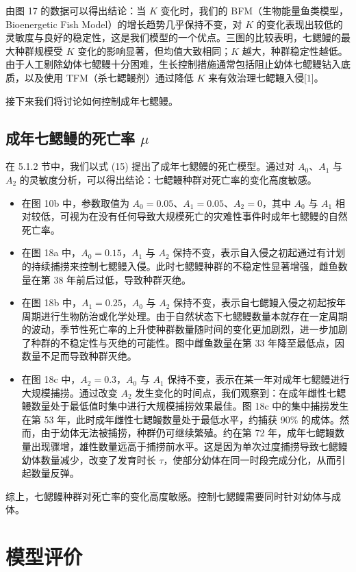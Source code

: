\documentclass[11pt,a4paper]{ctexart}
\begin{document}
由图 17 的数据可以得出结论：当 $K$ 变化时，我们的 BFM（生物能量鱼类模型，Bioenergetic Fish Model）的增长趋势几乎保持不变，对 $K$ 的变化表现出较低的灵敏度与良好的稳定性，这是我们模型的一个优点。三图的比较表明，七鳃鳗的最大种群规模受 $K$ 变化的影响显著，但均值大致相同；$K$ 越大，种群稳定性越低。由于人工剔除幼体七鳃鳗十分困难，生长控制措施通常包括阻止幼体七鳃鳗钻入底质，以及使用 TFM（杀七鳃鳗剂）通过降低 $K$ 来有效治理七鳃鳗入侵[1]。

接下来我们将讨论如何控制成年七鳃鳗。

\subsection{成年七鳃鳗的死亡率 $\mu$}

在 5.1.2 节中，我们以式 (15) 提出了成年七鳃鳗的死亡模型。通过对 $A_0$、$A_1$ 与 $A_2$ 的灵敏度分析，可以得出结论：七鳃鳗种群对死亡率的变化高度敏感。

\begin{itemize}
\item 在图 10b 中，参数取值为 $A_0=0.05$、$A_1=0.05$、$A_2=0$，其中 $A_0$ 与 $A_1$ 相对较低，可视为在没有任何导致大规模死亡的灾难性事件时成年七鳃鳗的自然死亡率。
\item 在图 18a 中，$A_0=0.15$，$A_1$ 与 $A_2$ 保持不变，表示自入侵之初起通过有计划的持续捕捞来控制七鳃鳗入侵。此时七鳃鳗种群的不稳定性显著增强，雌鱼数量在第 38 年前后过低，导致种群灭绝。
\item 在图 18b 中，$A_1=0.25$，$A_0$ 与 $A_2$ 保持不变，表示自七鳃鳗入侵之初起按年周期进行生物防治或化学处理。由于自然状态下七鳃鳗数量本就存在一定周期的波动，季节性死亡率的上升使种群数量随时间的变化更加剧烈，进一步加剧了种群的不稳定性与灭绝的可能性。图中雌鱼数量在第 33 年降至最低点，因数量不足而导致种群灭绝。
\item 在图 18c 中，$A_2=0.3$，$A_0$ 与 $A_1$ 保持不变，表示在某一年对成年七鳃鳗进行大规模捕捞。通过改变 $A_2$ 发生变化的时间点，我们观察到：在成年雌性七鳃鳗数量处于最低值时集中进行大规模捕捞效果最佳。图 18c 中的集中捕捞发生在第 53 年，此时成年雌性七鳃鳗数量处于最低水平，约捕获 90\% 的成体。然而，由于幼体无法被捕捞，种群仍可继续繁殖。约在第 72 年，成年七鳃鳗数量出现骤增，雄性数量远高于捕捞前水平。这是因为单次过度捕捞导致七鳃鳗幼体数量减少，改变了发育时长 $\tau$，使部分幼体在同一时段完成分化，从而引起数量反弹。
\end{itemize}

综上，七鳃鳗种群对死亡率的变化高度敏感。控制七鳃鳗需要同时针对幼体与成体。

\section{模型评价}
\end{document}
